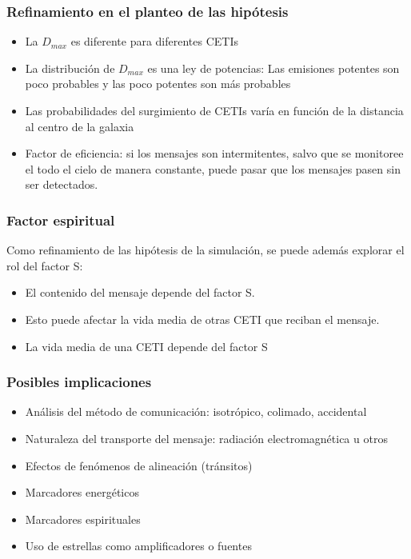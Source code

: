 \documentclass[handout]{beamer}
\theoremstyle{plain}
\theoremstyle{definition}
\theoremstyle{remark}
\begin{document}
\begin{frame}\frametitle{Refinamiento en el planteo de las hipótesis}

   \begin{itemize}
      \item La $D_{max}$ es diferente para diferentes CETIs
      \item La distribución de $D_{max}$ es una ley de potencias: Las
         emisiones potentes son poco probables y las poco potentes son
         más probables
      \item Las probabilidades del surgimiento de CETIs varía en
         función de la distancia al centro de la galaxia
      \item Factor de eficiencia: si los mensajes son intermitentes,
         salvo que se monitoree el todo el cielo de manera constante,
         puede pasar que los mensajes pasen sin ser detectados.
   \end{itemize}

\end{frame}%
                        
\begin{frame}\frametitle{Factor espiritual}

   Como refinamiento de las hipótesis de la simulación, se puede
   además explorar el rol del factor S:

   \begin{itemize}
      \item El contenido del mensaje depende del factor S.          
      \item Esto puede afectar la vida media de otras CETI que reciban el mensaje.
      \item La vida media de una CETI depende del factor S
   \end{itemize}

\end{frame}%
                     
\begin{frame}\frametitle{Posibles implicaciones}

   \begin{itemize}
      \item Análisis del método de comunicación: isotrópico, colimado,
         accidental
      \item Naturaleza del transporte del mensaje: radiación
         electromagnética u otros
      \item Efectos de fenómenos de alineación (tránsitos)
      \item Marcadores energéticos
      \item Marcadores espirituales
      \item Uso de estrellas como amplificadores o fuentes
   \end{itemize}

\end{frame}%
 
\end{document}
